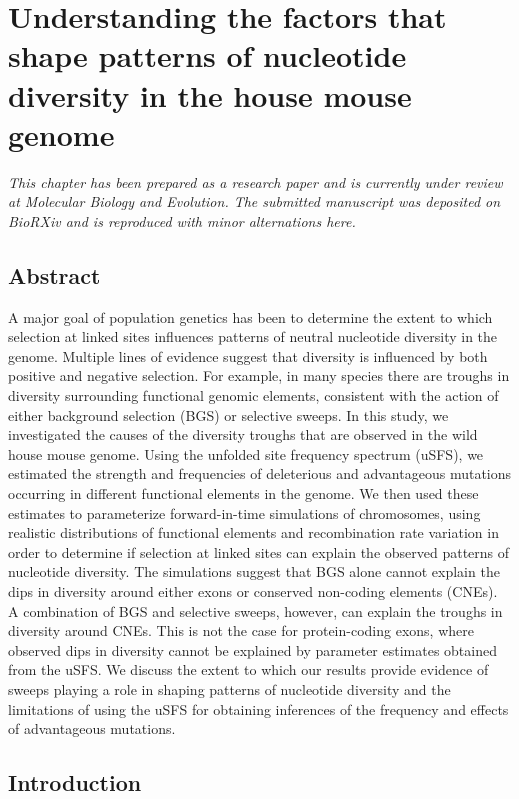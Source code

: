 \chapter{Understanding the factors that shape patterns of nucleotide diversity in the house mouse genome}

\emph{This chapter has been prepared as a research paper and is currently under review at Molecular Biology and Evolution. The submitted manuscript was deposited on \textit{BioRXiv} and is reproduced with minor alternations here.}

\section{Abstract}
	A major goal of population genetics has been to determine the extent to which selection at linked sites influences patterns of neutral nucleotide diversity in the genome. Multiple lines of evidence suggest that diversity is influenced by both positive and negative selection. For example, in many species there are troughs in diversity surrounding functional genomic elements, consistent with the action of either background selection (BGS) or selective sweeps. In this study, we investigated the causes of the diversity troughs that are observed in the wild house mouse genome. Using the unfolded site frequency spectrum (uSFS), we estimated the strength and frequencies of deleterious and advantageous mutations occurring in different functional elements in the genome. We then used these estimates to parameterize forward-in-time simulations of chromosomes, using realistic distributions of functional elements and recombination rate variation in order to determine if selection at linked sites can explain the observed patterns of nucleotide diversity. The simulations suggest that BGS alone cannot explain the dips in diversity around either exons or conserved non-coding elements (CNEs). A combination of BGS and selective sweeps, however, can explain the troughs in diversity around CNEs. This is not the case for protein-coding exons, where observed dips in diversity cannot be explained by parameter estimates obtained from the uSFS. We discuss the extent to which our results provide evidence of sweeps playing a role in shaping patterns of nucleotide diversity and the limitations of using the uSFS for obtaining inferences of the frequency and effects of advantageous mutations.


\section{Introduction}
 
